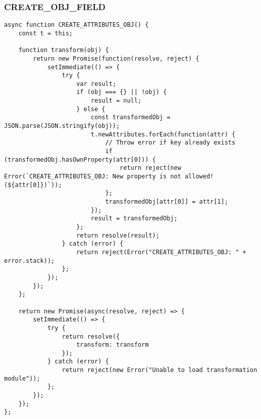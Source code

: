 \subsubsection{CREATE\_OBJ\_FIELD}
\label{netl-trans-create-obj-field}
\begin{verbatim}
async function CREATE_ATTRIBUTES_OBJ() {
    const t = this;

    function transform(obj) {
        return new Promise(function(resolve, reject) {
            setImmediate(() => {
                try {
                    var result;
                    if (obj === {} || !obj) {
                        result = null;
                    } else {
                        const transformedObj = JSON.parse(JSON.stringify(obj));
                        t.newAttributes.forEach(function(attr) {
                            // Throw error if key already exists
                            if (transformedObj.hasOwnProperty(attr[0])) {
                                return reject(new Error(`CREATE_ATTRIBUTES_OBJ: New property is not allowed! (${attr[0]})`));
                            };
                            transformedObj[attr[0]] = attr[1];
                        });
                        result = transformedObj;
                    };
                    return resolve(result);
                } catch (error) {
                    return reject(Error("CREATE_ATTRIBUTES_OBJ: " + error.stack));
                };
            });
        });
    };

    return new Promise(async(resolve, reject) => {
        setImmediate(() => {
            try {
                return resolve({
                    transform: transform
                });
            } catch (error) {
                return reject(new Error("Unable to load transformation module"));
            };
        });
    });
};
\end{verbatim}
